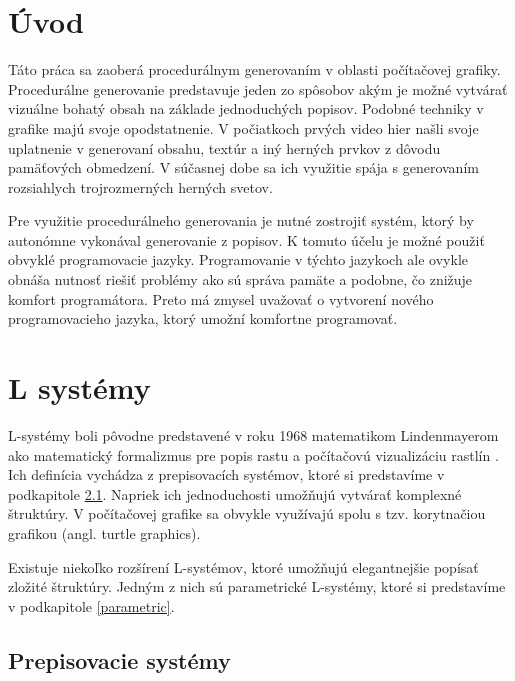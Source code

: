 

\chapter{Úvod}
Táto práca sa zaoberá procedurálnym generovaním v oblasti počítačovej grafiky.
Procedurálne generovanie predstavuje jeden zo spôsobov akým je možné vytvárať vizuálne bohatý obsah na základe jednoduchých popisov. 
Podobné techniky v grafike majú svoje opodstatnenie. V počiatkoch prvých video hier našli svoje uplatnenie v generovaní obsahu, textúr a iný herných prvkov z dôvodu pamäťových obmedzení. 
V súčasnej dobe sa ich využitie spája s generovaním rozsiahlych trojrozmerných herných svetov.

Pre využitie procedurálneho generovania je nutné zostrojiť systém, ktorý by autonómne vykonával generovanie z popisov. K tomuto účelu je možné
použiť obvyklé programovacie jazyky. Programovanie v týchto jazykoch ale ovykle obnáša nutnosť riešiť problémy ako sú správa pamäte a podobne, čo znižuje komfort programátora.
Preto má zmysel uvažovať o vytvorení nového programovacieho jazyka, ktorý umožní komfortne programovať.

\chapter{L systémy}
L-systémy boli pôvodne predstavené v roku 1968 matematikom Lindenmayerom ako matematický formalizmus pre popis rastu a počítačovú vizualizáciu rastlín \cite{Lsystems}.
Ich definícia vychádza z prepisovacích systémov, ktoré si predstavíme v podkapitole \ref{rewriting}.
Napriek ich jednoduchosti umožňujú vytvárať komplexné štruktúry. V počítačovej grafike sa obvykle využívajú spolu s tzv. korytnačiou grafikou (angl. turtle graphics).

Existuje niekoľko rozšírení L-systémov, ktoré umožňujú elegantnejšie popísať zložité štruktúry. Jedným z nich sú parametrické L-systémy, ktoré si predstavíme v podkapitole
\ref{parametric}.

\section{Prepisovacie systémy}\label{rewriting}
